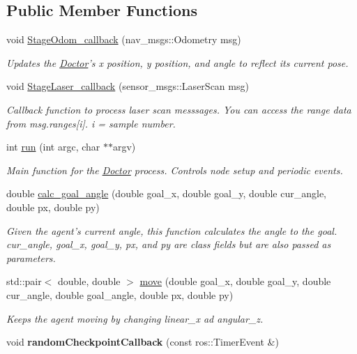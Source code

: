 \subsection*{Public Member Functions}
\begin{DoxyCompactItemize}
\item 
void \hyperlink{classDoctor_a92b20f52198c6137d8858152cba77640}{Stage\-Odom\-\_\-callback} (nav\-\_\-msgs\-::\-Odometry msg)
\begin{DoxyCompactList}\small\item\em Updates the \hyperlink{classDoctor}{Doctor}'s x position, y position, and angle to reflect its current pose. \end{DoxyCompactList}\item 
void \hyperlink{classDoctor_ab0b46ba92bd2069733f304858b7e4495}{Stage\-Laser\-\_\-callback} (sensor\-\_\-msgs\-::\-Laser\-Scan msg)
\begin{DoxyCompactList}\small\item\em Callback function to process laser scan messsages. You can access the range data from msg.\-ranges\mbox{[}i\mbox{]}. i = sample number. \end{DoxyCompactList}\item 
\hypertarget{classDoctor_a1fe9c9a74bd4d2044b7217ec82ae9e60}{int \hyperlink{classDoctor_a1fe9c9a74bd4d2044b7217ec82ae9e60}{run} (int argc, char $\ast$$\ast$argv)}\label{classDoctor_a1fe9c9a74bd4d2044b7217ec82ae9e60}

\begin{DoxyCompactList}\small\item\em Main function for the \hyperlink{classDoctor}{Doctor} process. Controls node setup and periodic events. \end{DoxyCompactList}\item 
double \hyperlink{classDoctor_a55fe6c06a3ce07fd9014a03000df43db}{calc\-\_\-goal\-\_\-angle} (double goal\-\_\-x, double goal\-\_\-y, double cur\-\_\-angle, double px, double py)
\begin{DoxyCompactList}\small\item\em Given the agent's current angle, this function calculates the angle to the goal. cur\-\_\-angle, goal\-\_\-x, goal\-\_\-y, px, and py are class fields but are also passed as parameters. \end{DoxyCompactList}\item 
std\-::pair$<$ double, double $>$ \hyperlink{classDoctor_ada60bb6625be46966ff86f7af9d05366}{move} (double goal\-\_\-x, double goal\-\_\-y, double cur\-\_\-angle, double goal\-\_\-angle, double px, double py)
\begin{DoxyCompactList}\small\item\em Keeps the agent moving by changing linear\-\_\-x ad angular\-\_\-z. \end{DoxyCompactList}\item 
\hypertarget{classDoctor_a21ac6188dd7f5890ff1a633cf700144d}{void {\bfseries random\-Checkpoint\-Callback} (const ros\-::\-Timer\-Event \&)}\label{classDoctor_a21ac6188dd7f5890ff1a633cf700144d}


\end{DoxyCompactItemize}
